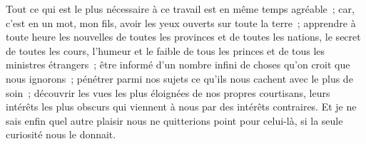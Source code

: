 \documentclass[11pt,twoside,openany]{book}
\newenvironment{lateiDocument}{}{}
\begin{document}
\begin{lateiDocument}
\begin{teiElement}[name={TEI},change={commons\_edition}]
\begin{teiElement}[name={text},type={book},xmlid={book}]
\begin{teiElement}[name={group},type={book},xmlid={book-001}]
\begin{teiElement}
\begin{teiElement}[name={body},xmlid={body-001}]
\begin{teiCit}[xmlid={cit01}]
            \begin{teiQuote}
Tout ce qui est le plus nécessaire à ce travail est en même temps agréable ; car, c’est en un mot, mon fils, avoir les yeux ouverts sur toute la terre ; apprendre à toute heure les nouvelles de toutes les provinces et de toutes les nations, le secret de toutes les cours, l’humeur et le faible de tous les princes et de tous les ministres étrangers ; être informé d’un nombre infini de choses qu’on croit que nous ignorons ; pénétrer parmi nos sujets ce qu’ils nous cachent avec le plus de soin ; découvrir les vues les plus éloignées de nos propres courtisans, leurs intérêts les plus obscurs qui viennent à nous par des intérêts contraires. Et je ne sais enfin quel autre plaisir nous ne quitterions point pour celui-là, si la seule curiosité nous le donnait.
\end{teiQuote}
          

\end{teiCit}
\end{teiElement}
\end{teiElement}
\end{teiElement}
\end{teiElement}
\end{teiElement}
\end{lateiDocument}
\end{document}

